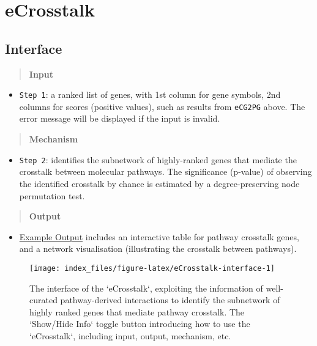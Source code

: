 \documentclass[
  oneside]{book}
\providecommand{\tightlist}{%
  \setlength{\itemsep}{0pt}\setlength{\parskip}{0pt}}
\begin{document}
\hypertarget{ecrosstalk}{%
\chapter{eCrosstalk}\label{ecrosstalk}}

\hypertarget{interface-2}{%
\section{Interface}\label{interface-2}}

\begin{quote}
\textbf{Input}
\end{quote}

\begin{itemize}
\tightlist
\item
  \texttt{Step\ 1}: a ranked list of genes, with 1st column for gene symbols, 2nd columns for scores (positive values), such as results from \texttt{eCG2PG} above. The error message will be displayed if the input is invalid.
\end{itemize}

\begin{quote}
\textbf{Mechanism}
\end{quote}

\begin{itemize}
\tightlist
\item
  \texttt{Step\ 2}: identifies the subnetwork of highly-ranked genes that mediate the crosstalk between molecular pathways. The significance (p-value) of observing the identified crosstalk by chance is estimated by a degree-preserving node permutation test.
\end{itemize}

\begin{quote}
\textbf{Output}
\end{quote}

\begin{itemize}
\tightlist
\item
  \href{/app/examples/_tmp_RMD_eCrosstalk.html}{Example Output} includes an interactive table for pathway crosstalk genes, and a network visualisation (illustrating the crosstalk between pathways).
\end{itemize}

\begin{figure}

{\centering \texttt{[image: index\_files/figure-latex/eCrosstalk-interface-1]} 

}

\caption{The interface of the `eCrosstalk`, exploiting the information of well-curated pathway-derived interactions to identify the subnetwork of highly ranked genes that mediate pathway crosstalk. The `Show/Hide Info` toggle button introducing how to use the `eCrosstalk`, including input, output, mechanism, etc.}\label{fig:eCrosstalk-interface}
\end{figure}
\end{document}
